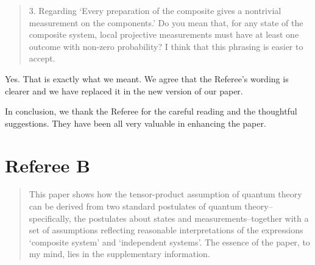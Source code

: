 \documentclass[11pt]{article}
\begin{document}
\begin{quote}
3. Regarding `Every preparation of the composite gives a
nontrivial measurement on the components.' Do you mean that, for any
state of the composite system, local projective measurements must have
at least one outcome with non-zero probability? I think that this
phrasing is easier to accept.
\end{quote}
Yes. That is exactly what we meant. We agree that the Referee's
wording is clearer and we have replaced it in the new version of our
paper. 

In conclusion, we thank the Referee for the careful reading and the
thoughtful suggestions. They have been all very valuable in enhancing
the paper.

\section*{Referee B}

\begin{quote}
This paper shows how the tensor-product assumption of
quantum theory can be derived from two standard postulates of quantum
theory--specifically, the postulates about states and
measurements--together with a set of assumptions reflecting reasonable
interpretations of the expressions `composite system' and `independent
systems'. The essence of the paper, to my mind, lies in the
supplementary information.
\end{quote}
\end{document}
